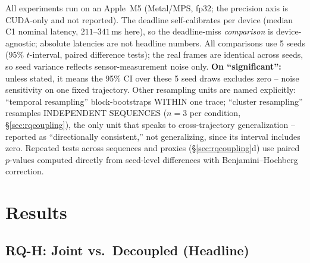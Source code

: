 \documentclass[conference]{IEEEtran}
\begin{document}
All experiments run on an Apple~M5 (Metal/MPS, fp32; the precision
axis is CUDA-only and not reported). The deadline self-calibrates per
device (median C1 nominal latency, $211$--$341$\,ms here), so the
deadline-miss \emph{comparison} is device-agnostic; absolute
latencies are not headline numbers. All comparisons use 5 seeds
(95\% $t$-interval, paired difference tests); the real frames are
identical across seeds, so seed variance reflects sensor-measurement
noise only. \textbf{On ``significant'':} unless stated, it means the
95\% CI over these 5 seed draws excludes zero -- noise sensitivity on
one fixed trajectory. Other resampling units are named explicitly:
``temporal resampling'' block-bootstraps WITHIN one trace; ``cluster
resampling'' resamples INDEPENDENT SEQUENCES ($n{=}3$ per condition,
\S\ref{sec:rqcoupling}), the only unit that speaks to cross-trajectory
generalization -- reported as ``directionally consistent,'' not
generalizing, since its interval includes zero. Repeated tests across
sequences and proxies (\S\ref{sec:rqcoupling}d) use paired $p$-values
computed directly from seed-level differences with
Benjamini--Hochberg correction.

\section{Results}
\label{sec:results}

\subsection{RQ-H: Joint vs.\ Decoupled (Headline)}
\end{document}
